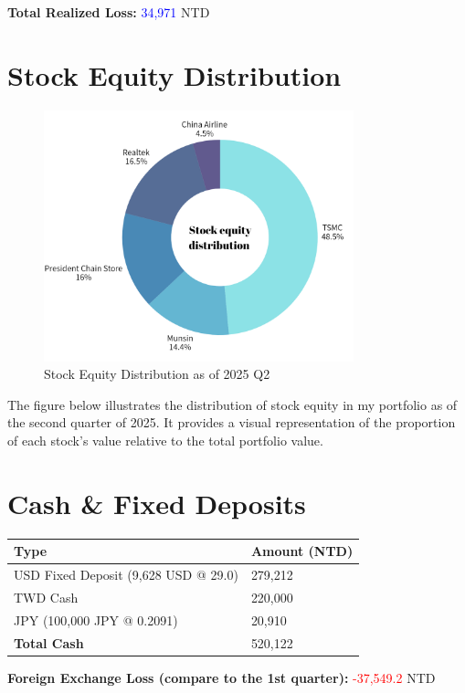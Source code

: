 \documentclass[a4paper,12pt]{article}
\begin{document}
\textbf{Total Realized Loss:} \textcolor{blue}{34,971} NTD

\section{Stock Equity Distribution}
\begin{figure}[H]
    \centering
    \includegraphics[width=0.8\textwidth]{stock_equity_distribution.png}
    \caption{Stock Equity Distribution as of 2025 Q2}
    \label{fig:stock_equity_distribution}
\end{figure}

\noindent The figure below illustrates the distribution of stock equity in my portfolio as of the second quarter of 2025. It provides a visual representation of the proportion of each stock's value relative to the total portfolio value.


\section{Cash \& Fixed Deposits}
\begin{longtable}{ll}
    \toprule
    Type & Amount (NTD) \\
    \midrule
    USD Fixed Deposit (9,628 USD @ 29.0) & 279,212 \\
    TWD Cash                             & 220,000 \\
    JPY           (100,000 JPY @ 0.2091) & 20,910 \\
    \bottomrule
    \textbf{Total Cash} & 520,122 \\
\end{longtable}

\textbf{Foreign Exchange Loss (compare to the 1st quarter):} \textcolor{red}{-37,549.2} NTD
\end{document}
